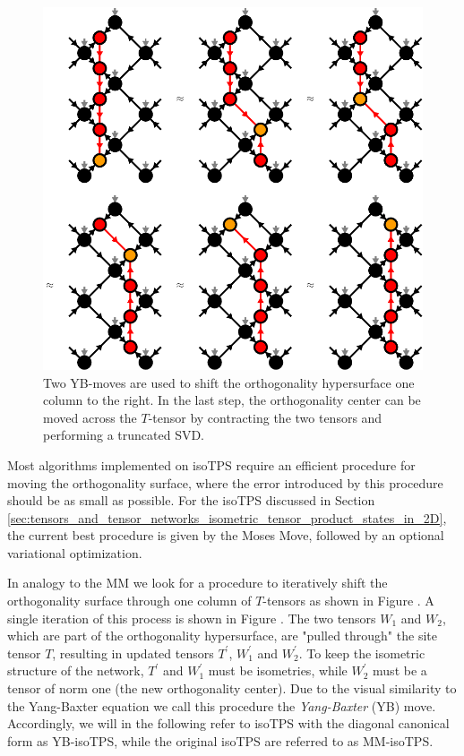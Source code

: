 \begin{figure}
	\centering
	\includegraphics[scale=1]{figures/tikz/YB_isoTPS/shifting_ortho_surface/shifting_ortho_surface.pdf}
	\caption{Two YB-moves are used to shift the orthogonality hypersurface one column to the right. In the last step, the orthogonality center can be moved across the $T$-tensor by contracting the two tensors and performing a truncated SVD.}
	\label{fig:YB_isoTPS_moving_ortho_surface}
\end{figure}
Most algorithms implemented on isoTPS require an efficient procedure for moving the orthogonality surface, where the error introduced by this procedure should be as small as possible. For the isoTPS discussed in Section \ref{sec:tensors_and_tensor_networks_isometric_tensor_product_states_in_2D}, the current best procedure is given by the Moses Move, followed by an optional variational optimization. \par
In analogy to the MM we look for a procedure to iteratively shift the orthogonality surface through one column of $T$-tensors as shown in Figure . A single iteration of this process is shown in Figure . The two tensors $W_1$ and $W_2$, which are part of the orthogonality hypersurface, are "pulled through" the site tensor $T$, resulting in updated tensors $T^\prime$, $W_1^\prime$ and $W_2^\prime$. To keep the isometric structure of the network, $T^\prime$ and $W_1^\prime$ must be isometries, while $W_2^\prime$ must be a tensor of norm one (the new orthogonality center). Due to the visual similarity to the Yang-Baxter equation we call this procedure the \textit{Yang-Baxter} (YB) move. Accordingly, we will in the following refer to isoTPS with the diagonal canonical form as YB-isoTPS, while the original isoTPS are referred to as MM-isoTPS. \par
